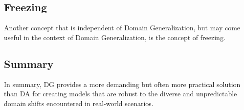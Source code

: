\subsection{Freezing}
Another concept that is independent of Domain Generalization, but may come useful in the context of Domain Generalization, is the concept of freezing.


\subsection*{Summary}
In summary, DG provides a more demanding but often more practical solution than DA for creating models that are robust to the diverse and unpredictable domain shifts encountered in real-world scenarios.

\clearpage